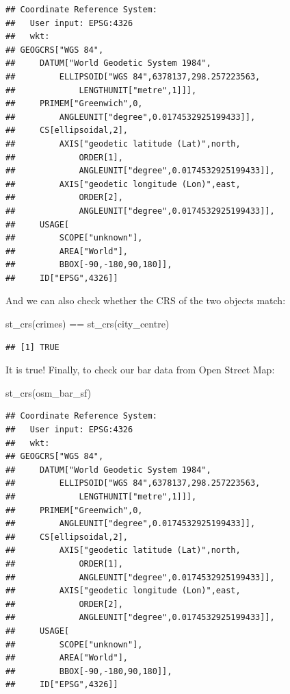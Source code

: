 \documentclass[
]{book}
\makeatletter
\newenvironment{Shaded}{\begin{snugshade}}{\end{snugshade}}
\newcommand{\FunctionTok}[1]{\textcolor[rgb]{0,0,0}{#1}}
\newcommand{\NormalTok}[1]{#1}
\newcommand{\SpecialCharTok}[1]{\textcolor[rgb]{0,0,0}{#1}}
\newenvironment{kframe}{%
\medskip{}
\setlength{\fboxsep}{.8em}
 \def\at@end@of@kframe{}%
 \ifinner\ifhmode%
  \def\at@end@of@kframe{\end{minipage}}%
  \begin{minipage}{\columnwidth}%
 \fi\fi%
 \def\FrameCommand##1{\hskip\@totalleftmargin \hskip-\fboxsep
 \colorbox{shadecolor}{##1}\hskip-\fboxsep
     \hskip-\linewidth \hskip-\@totalleftmargin \hskip\columnwidth}%
 \MakeFramed {\advance\hsize-\width
   \@totalleftmargin\z@ \linewidth\hsize
   \@setminipage}}%
 {\par\unskip\endMakeFramed%
 \at@end@of@kframe}
\renewenvironment{Shaded}{\begin{kframe}}{\end{kframe}}
\makeatother
\begin{document}
\begin{verbatim}
## Coordinate Reference System:
##   User input: EPSG:4326 
##   wkt:
## GEOGCRS["WGS 84",
##     DATUM["World Geodetic System 1984",
##         ELLIPSOID["WGS 84",6378137,298.257223563,
##             LENGTHUNIT["metre",1]]],
##     PRIMEM["Greenwich",0,
##         ANGLEUNIT["degree",0.0174532925199433]],
##     CS[ellipsoidal,2],
##         AXIS["geodetic latitude (Lat)",north,
##             ORDER[1],
##             ANGLEUNIT["degree",0.0174532925199433]],
##         AXIS["geodetic longitude (Lon)",east,
##             ORDER[2],
##             ANGLEUNIT["degree",0.0174532925199433]],
##     USAGE[
##         SCOPE["unknown"],
##         AREA["World"],
##         BBOX[-90,-180,90,180]],
##     ID["EPSG",4326]]
\end{verbatim}

And we can also check whether the CRS of the two objects match:

\begin{Shaded}
\begin{Highlighting}[]
\FunctionTok{st\_crs}\NormalTok{(crimes) }\SpecialCharTok{==} \FunctionTok{st\_crs}\NormalTok{(city\_centre)}
\end{Highlighting}
\end{Shaded}

\begin{verbatim}
## [1] TRUE
\end{verbatim}

It is true! Finally, to check our bar data from Open Street Map:

\begin{Shaded}
\begin{Highlighting}[]
\FunctionTok{st\_crs}\NormalTok{(osm\_bar\_sf)}
\end{Highlighting}
\end{Shaded}

\begin{verbatim}
## Coordinate Reference System:
##   User input: EPSG:4326 
##   wkt:
## GEOGCRS["WGS 84",
##     DATUM["World Geodetic System 1984",
##         ELLIPSOID["WGS 84",6378137,298.257223563,
##             LENGTHUNIT["metre",1]]],
##     PRIMEM["Greenwich",0,
##         ANGLEUNIT["degree",0.0174532925199433]],
##     CS[ellipsoidal,2],
##         AXIS["geodetic latitude (Lat)",north,
##             ORDER[1],
##             ANGLEUNIT["degree",0.0174532925199433]],
##         AXIS["geodetic longitude (Lon)",east,
##             ORDER[2],
##             ANGLEUNIT["degree",0.0174532925199433]],
##     USAGE[
##         SCOPE["unknown"],
##         AREA["World"],
##         BBOX[-90,-180,90,180]],
##     ID["EPSG",4326]]
\end{verbatim}
\end{document}
